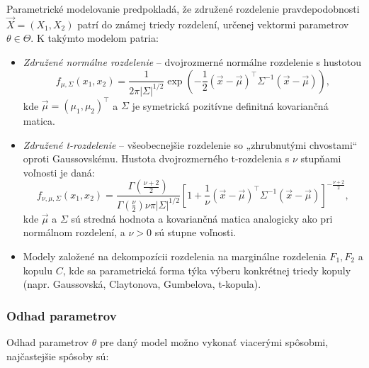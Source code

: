Parametrické modelovanie predpokladá, že združené rozdelenie pravdepodobnosti $\vec{X} = (X_1, X_2)$ patrí do známej triedy rozdelení, určenej vektormi parametrov $\theta \in \Theta$. K takýmto modelom patria:

\begin{itemize}
  \item \textit{Združené normálne rozdelenie} – dvojrozmerné normálne rozdelenie s hustotou
  \begin{equation}
  f_{\mu, \Sigma}(x_1, x_2) = \frac{1}{2\pi |\Sigma|^{1/2}} \exp\left( -\frac{1}{2} (\vec{x} - \vec{\mu})^\top \Sigma^{-1} (\vec{x} - \vec{\mu}) \right),
  \end{equation}
  kde $\vec{\mu} = (\mu_1, \mu_2)^\top$ a $\Sigma$ je symetrická pozitívne definitná kovariančná matica.

   \item \textit{Združené t-rozdelenie} – všeobecnejšie rozdelenie so „zhrubnutými chvostami“ oproti Gaussovskému. Hustota dvojrozmerného t-rozdelenia s $\nu$ stupňami voľnosti je daná:
  \begin{equation}
  f_{\nu, \mu, \Sigma}(x_1, x_2) = \frac{\Gamma\left(\frac{\nu + 2}{2}\right)}{\Gamma\left(\frac{\nu}{2}\right)\nu\pi |\Sigma|^{1/2}} \left[ 1 + \frac{1}{\nu} (\vec{x} - \vec{\mu})^\top \Sigma^{-1} (\vec{x} - \vec{\mu}) \right]^{-\frac{\nu + 2}{2}},
  \end{equation}
  kde $\vec{\mu}$ a $\Sigma$ sú stredná hodnota a kovariančná matica analogicky ako pri normálnom rozdelení, a $\nu > 0$ sú stupne voľnosti.
  
  \item Modely založené na dekompozícii rozdelenia na marginálne rozdelenia $F_1, F_2$ a kopulu $C$, kde sa parametrická forma týka výberu konkrétnej triedy kopuly (napr. Gaussovská, Claytonova, Gumbelova, t-kopula).
\end{itemize}

\subsubsection{Odhad parametrov}\label{subsubsec:param_estimation}

Odhad parametrov $\theta$ pre daný model možno vykonať viacerými spôsobmi, najčastejšie spôsoby sú:


